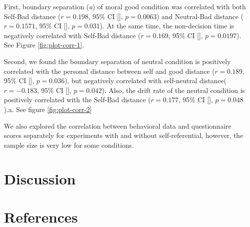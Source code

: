 \documentclass[
  english,
  man]{apa6}
\begin{document}
First, boundary separation (\emph{a}) of moral good condition was correlated with both Self-Bad distance (\(r = 0.198\), 95\% CI {[}{]}, \(p = 0.0063\)) and Neutral-Bad distance (\(r = 0.1571\), 95\% CI {[}{]}, \(p = 0.031\)). At the same time, the non-decision time is negatively correlated with Self-Bad distance (\(r = 0.169\), 95\% CI {[}{]}, \(p = 0.0197\)). See Figure \ref{fig:plot-corr-1}.

Second, we found the boundary separation of neutral condition is positively correlated with the personal distance between self and good distance (\(r = 0.189\), 95\% CI {[}{]}, \(p = 0.036\)), but negatively correlated with self-neutral distance(\(r = -0.183\), 95\% CI {[}{]}, \(p = 0.042\)). Also, the drift rate of the neutral condition is positively correlated with the Self-Bad distance (\(r = 0.177\), 95\% CI {[}{]}, \(p = 0.048\)).a. See figure \ref{fig:plot-corr-2}

We also explored the correlation between behavioral data and questionnaire scores separately for experiments with and without self-referential, however, the sample size is very low for some conditions.

\hypertarget{discussion}{%
\section{Discussion}\label{discussion}}

\hypertarget{references}{%
\section{References}\label{references}}

\begingroup
\setlength{\parindent}{-0.5in}
\setlength{\leftskip}{0.5in}
\end{document}
